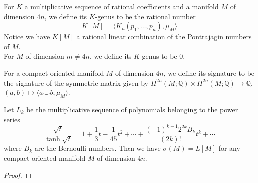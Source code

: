 	\begin{defn}
		For $K$ a multiplicative sequence of rational coefficients and a manifold $M$ of dimension $4n$, we define its $K$-genus to be the rational number 
		\[ K[M]=\langle K_n(p_1,\dots,p_n),\mu_M\rangle \]
		Notice we have $K[M]$ a rational linear combination of the Pontrajagin numbers of $M$. \\
		For $M$ of dimension $m\neq 4n$, we define its $K$-genus to be $0$. 
	\end{defn}
	\begin{defn}
		For a compact oriented manifold $M$ of dimension $4n$, we define its signature to be the signature of the symmetric matrix given by $H^{2n}(M;\mathbb{Q})\times H^{2n}(M;\mathbb{Q})\to\mathbb{Q}$, $(a,b)\mapsto\langle a\smile b,\mu_M\rangle$. 
	\end{defn}
	\begin{thm}\label{Signature_thm}
		Let $L_k$ be the multiplicative sequence of polynomials belonging to the power series
		\[ \frac{\sqrt{t}}{\tanh\sqrt{t}}=1+\frac{1}{3}t-\frac{1}{45}t^2+\cdots+\frac{(-1)^{k-1}2^{2k}B_k}{(2k)!}t^{k}+\cdots \]
		where $B_k$ are the Bernoulli numbers. Then we have $\sigma(M)=L[M]$ for any compact oriented manifold $M$ of dimension $4n$. 
	\end{thm}
	\begin{proof}
		
	\end{proof}


